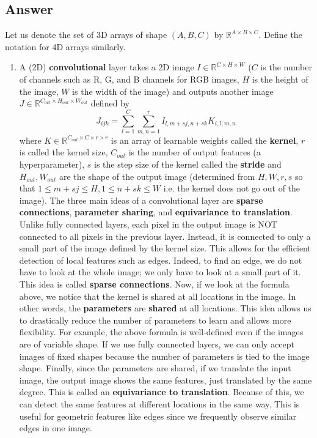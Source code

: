 \documentclass[
	12pt, %
]{../Template/fphw}
\begin{document}
\subsection*{Answer}
Let us denote the set of 3D arrays of shape $(A,B,C)$ by $\mathbb{R}^{A\times B\times C}$. Define the notation for 4D arrays similarly.
\begin{enumerate}[label=(\arabic*)]
    \item A (2D) \textbf{convolutional} layer takes a 2D image $I \in \mathbb{R}^{C\times H\times W}$ ($C$ is the number of channels such as R, G, and B channels for RGB images, $H$ is the height of the image, $W$ is the width of the image) and outputs another image $J \in \mathbb{R}^{C_{out}\times H_{out}\times W_{out}}$ defined by
    \begin{equation}
        J_{ijk} = \sum_{l=1}^{C}\sum_{m,n=1}^{r} I_{l,m+sj, n+sk}K_{i,l,m,n}
    \end{equation}
    where $K\in \mathbb{R}^{C_{out}\times C\times r\times r}$ is an array of learnable weights called the \textbf{kernel}, $r$ is called the kernel size, $C_{out}$ is the number of output features (a hyperparameter), $s$ is the step size of the kernel called the \textbf{stride} and  $H_{out},W_{out}$ are the shape of the output image (determined from $H,W,r,s$ so that $1\leq m+sj\leq H, 1\leq n+sk\leq W$ i.e. the kernel does not go out of the image).
    The three main ideas of a convolutional layer are \textbf{sparse connections}, \textbf{parameter sharing}, and \textbf{equivariance to translation}. Unlike fully connected layers, each pixel in the output image is NOT connected to all pixels in the previous layer. Instead, it is connected to only a small part of the image defined by the kernel size. This allows for the efficient detection of local features such as edges. Indeed, to find an edge, we do not have to look at the whole image; we only have to look at a small part of it. This idea is called \textbf{sparse connections}. Now, if we look at the formula above, we notice that the kernel is shared at all locations in the image. In other words, the \textbf{parameters} are \textbf{shared} at all locations. This idea allows us to drastically reduce the number of parameters to learn and allows more flexibility. For example, the above formula is well-defined even if the images are of variable shape. If we use fully connected layers, we can only accept images of fixed shapes because the number of parameters is tied to the image shape. Finally, since the parameters are shared, if we translate the input image, the output image shows the same features, just translated by the same degree. This is called an \textbf{equivariance to translation}. Because of this, we can detect the same features at different locations in the same way. This is useful for geometric features like edges since we frequently observe similar edges in one image.


\end{enumerate}
\end{document}
